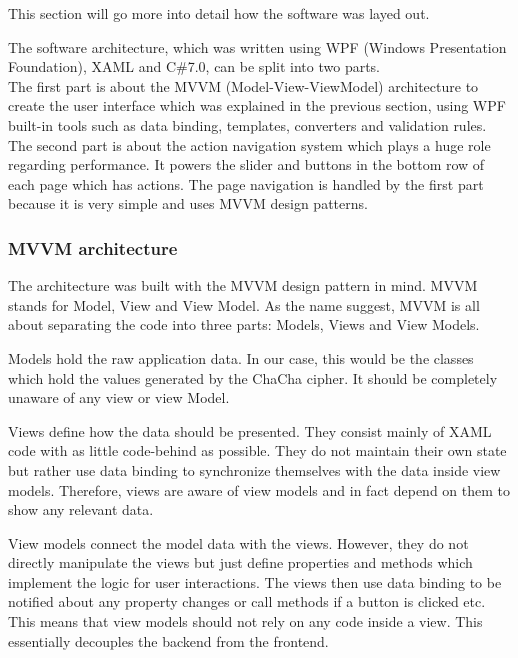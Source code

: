 This section will go more into detail how the software was layed out.

\noindent
The software architecture, which was written using WPF (Windows Presentation Foundation), XAML and C\#7.0, can be split into two parts. \\
The first part is about the MVVM (Model-View-ViewModel) architecture to create the user interface which was explained in the previous section, using WPF built-in tools such as data binding, templates, converters and validation rules. \\
The second part is about the action navigation system which plays a huge role regarding performance. It powers the slider and buttons in the bottom row of each page which has actions. The page navigation is handled by the first part because it is very simple and uses MVVM design patterns.

\subsubsection{MVVM architecture}

The architecture was built with the MVVM design pattern in mind. MVVM stands for Model, View and View Model. As the name suggest, MVVM is all about separating the code into three parts: Models, Views and View Models.

Models hold the raw application data. In our case, this would be the classes which hold the values generated by the ChaCha cipher. It should be completely unaware of any view or view Model.

Views define how the data should be presented. They consist mainly of XAML code with as little code-behind as possible. They do not maintain their own state but rather use data binding to synchronize themselves with the data inside view models. Therefore, views are aware of view models and in fact depend on them to show any relevant data.

View models connect the model data with the views. However, they do not directly manipulate the views but just define properties and methods which implement the logic for user interactions. The views then use data binding to be notified about any property changes or call methods if a button is clicked etc. This means that view models should not rely on any code inside a view. This essentially decouples the backend from the frontend.

